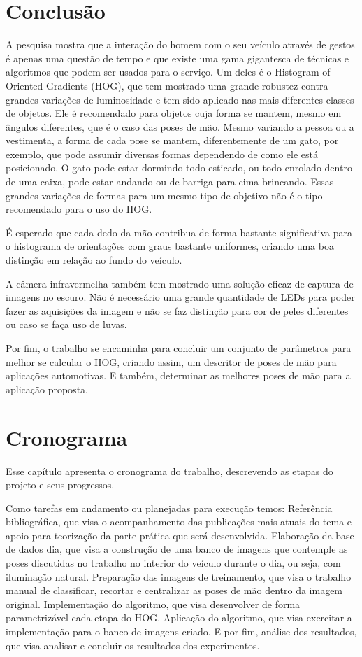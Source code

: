 \chapter{Conclusão}

A pesquisa mostra que a interação do homem com o seu veículo através de gestos é apenas uma questão de tempo e que existe uma gama gigantesca de técnicas e algoritmos que podem ser usados para o serviço. Um deles é o Histogram of Oriented Gradients (HOG), que tem mostrado uma grande robustez contra grandes variações de luminosidade e tem sido aplicado nas mais diferentes classes de objetos. Ele é recomendado para objetos cuja forma se mantem, mesmo em ângulos diferentes, que é o caso das poses de mão. Mesmo variando a pessoa ou a vestimenta, a forma de cada pose se mantem, diferentemente de um gato, por exemplo, que pode assumir diversas formas dependendo de como ele está posicionado. O gato pode estar dormindo todo esticado, ou todo enrolado dentro de uma caixa, pode estar andando ou de barriga para cima brincando. Essas grandes variações de formas para um mesmo tipo de objetivo não é o tipo recomendado para o uso do HOG.

É esperado que cada dedo da mão contribua de forma bastante significativa para o histograma de orientações com graus bastante uniformes, criando uma boa distinção em relação ao fundo do veículo.

A câmera infravermelha também tem mostrado uma solução eficaz de captura de imagens no escuro. Não é necessário uma grande quantidade de LEDs para poder fazer as aquisições da imagem e não se faz distinção para cor de peles diferentes ou caso se faça uso de luvas.

Por fim, o trabalho se encaminha para concluir um conjunto de parâmetros para melhor se calcular o HOG, criando assim, um descritor de poses de mão para aplicações automotivas. E também, determinar as melhores poses de mão para a aplicação proposta.

\chapter{Cronograma}

Esse capítulo apresenta o cronograma do trabalho, descrevendo as etapas do projeto e seus progressos.

Como tarefas em andamento ou planejadas para execução temos: Referência bibliográfica, que visa o acompanhamento das publicações mais atuais do tema e apoio para teorização da parte prática que será desenvolvida. Elaboração da base de dados dia, que visa a construção de uma banco de imagens que contemple as poses discutidas no trabalho no interior do veículo durante o dia, ou seja, com iluminação natural. Preparação das imagens de treinamento, que visa o trabalho manual de classificar, recortar e centralizar as poses de mão dentro da imagem original. Implementação do algoritmo, que visa desenvolver de forma parametrizável cada etapa do HOG. Aplicação do algoritmo, que visa exercitar a implementação para o banco de imagens criado. E por fim, análise dos resultados, que visa analisar e concluir os resultados dos experimentos. 

